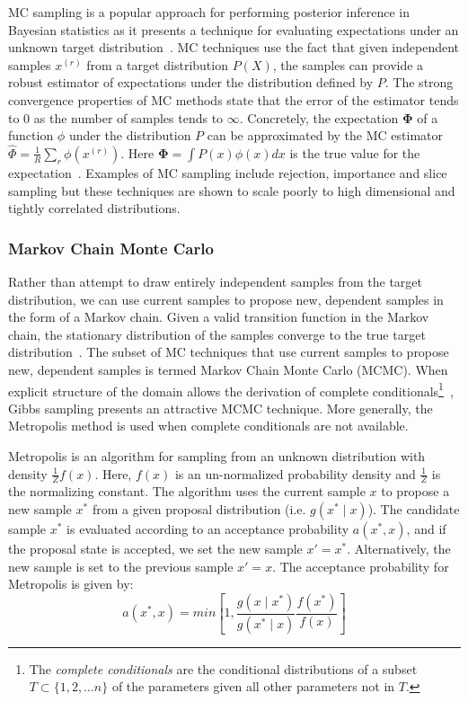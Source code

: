 MC sampling is a popular approach for performing posterior inference in Bayesian statistics as it presents a technique for evaluating expectations under an unknown target distribution~\citep{mackay1998introduction}. MC techniques use the fact that given independent samples $x^{(r)}$ from a target distribution $P(X)$, the samples can provide a robust estimator of expectations under the distribution defined by $P$. The strong convergence properties of MC methods state that the error of the estimator tends to $0$ as the number of samples tends to $\infty$. Concretely, the expectation $\mathbf{\Phi}$ of a function $\phi$ under the distribution $P$ can be approximated by the MC estimator $\hat{\Phi} = \frac{1}{R}\sum\limits_r \phi(x^{(r)})$. Here $\mathbf{\Phi} = \int P(x)\phi(x) dx$ is the true value for the expectation~\citep{mackay1998introduction}. Examples of MC sampling include rejection, importance and slice sampling but these techniques are shown to scale poorly to high dimensional and tightly correlated distributions.
\subsubsection{Markov Chain Monte Carlo}\label{sec:mcmc}
Rather than attempt to draw entirely independent samples from the target distribution, we can use current samples to propose new, dependent samples in the form of a Markov chain. Given a valid transition function in the Markov chain, the stationary distribution of the samples converge to the true target distribution~\citep{mackay1998introduction}. The subset of MC techniques that use current samples to propose new, dependent samples is termed Markov Chain Monte Carlo (MCMC). When explicit structure of the domain allows the derivation of complete conditionals\footnote{The \textit{complete conditionals} are the conditional distributions of a subset $T \subset \{ 1, 2, \hdots n \}$ of the parameters given all other parameters not in $T$.}~\citep{mackay1998introduction}, Gibbs sampling presents an attractive MCMC technique. More generally, the Metropolis method is used when complete conditionals are not available.

Metropolis is an algorithm for sampling from an unknown distribution with density $\frac{1}{Z} f(x)$. Here, $f(x)$ is an un-normalized probability density and $\frac{1}{Z}$ is the normalizing constant. The algorithm uses the current sample $x$ to propose a new sample $x^*$ from a given proposal distribution (i.e. $g(x^* \mid x)$). The candidate sample $x^*$ is evaluated according to an acceptance probability $a(x^*, x)$, and if the proposal state is accepted, we set the new sample $x' = x^*$. Alternatively, the new sample is set to the previous sample $x' = x$. The acceptance probability for Metropolis is given by:
\begin{equation}
	a(x^*, x) = min \left[ 1, \frac{g(x \mid x^*)}{g(x^* \mid x)} \frac{f(x^*)}{f(x)} \right]
\end{equation}

